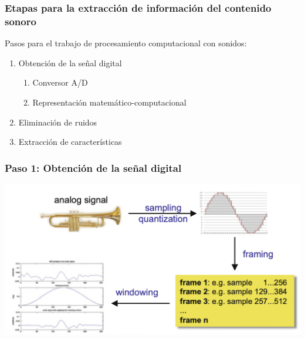 \documentclass[
10pt, %
aspectratio=169, %
]{beamer}
\begin{document}
	\begin{frame}
		
		\frametitle{Etapas para la extracción de información del contenido sonoro}
		
		Pasos para el trabajo de procesamiento computacional con sonidos:
		\begin{enumerate}
			\item Obtención de la señal digital
			\begin{enumerate}[label=1.\arabic*.]
				\item Conversor A/D
				\item Representación matemático-computacional
			\end{enumerate}
			\item Eliminación de ruidos
			\item Extracción de características
		\end{enumerate}
		
	\end{frame}
	
	\begin{frame}
		
		\frametitle{Paso 1: Obtención de la señal digital}
		
		\centering
		\includegraphics[scale=0.6]{paso1.png}
		
	\end{frame}
	
\end{document}
